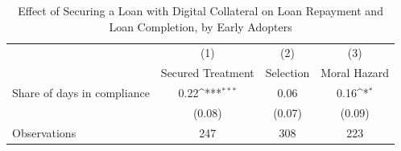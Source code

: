 \begin{table}[htbp]\centering
\def\sym#1{\ifmmode^{#1}\else\(^{#1}\)\fi}
\caption{Effect of Securing a Loan with Digital Collateral on Loan Repayment and Loan Completion, by Early Adopters\label{LASMH\_complete\_earlyadopt\_LATE\_150}}
\begin{tabular}{l*{3}{c}}
\toprule
                    &\multicolumn{1}{c}{(1)}&\multicolumn{1}{c}{(2)}&\multicolumn{1}{c}{(3)}\\
                    &\multicolumn{1}{c}{Secured Treatment}&\multicolumn{1}{c}{Selection}&\multicolumn{1}{c}{Moral Hazard}\\
\midrule
Share of days in compliance&        0.22\sym{***}&        0.06         &        0.16\sym{*}  \\
                    &      (0.08)         &      (0.07)         &      (0.09)         \\
\midrule
Observations        &         247         &         308         &         223         \\
\bottomrule
\end{tabular}
\end{table}
